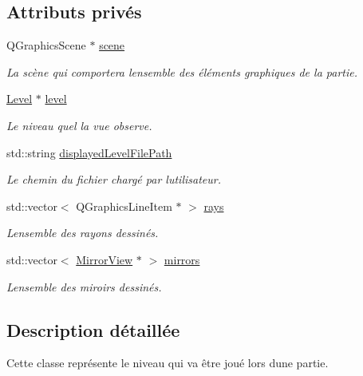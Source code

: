 \subsection*{Attributs privés}
\begin{DoxyCompactItemize}
\item 
Q\+Graphics\+Scene $\ast$ \hyperlink{classLevelView_a81030b9faa8743a629553447bfb982ea}{scene}
\begin{DoxyCompactList}\small\item\em La scène qui comportera l\textquotesingle{}ensemble des éléments graphiques de la partie. \end{DoxyCompactList}\item 
\hyperlink{classLevel}{Level} $\ast$ \hyperlink{classLevelView_ab51fb77e921a425c79b9671ebb8718e2}{level}
\begin{DoxyCompactList}\small\item\em Le niveau quel la vue observe. \end{DoxyCompactList}\item 
std\+::string \hyperlink{classLevelView_a826d9224c5bbbecb5c02b7734d0b8137}{displayed\+Level\+File\+Path}
\begin{DoxyCompactList}\small\item\em Le chemin du fichier chargé par l\textquotesingle{}utilisateur. \end{DoxyCompactList}\item 
std\+::vector$<$ Q\+Graphics\+Line\+Item $\ast$ $>$ \hyperlink{classLevelView_a79c31b19d94522a4756bcf0bbae0c1a1}{rays}
\begin{DoxyCompactList}\small\item\em L\textquotesingle{}ensemble des rayons dessinés. \end{DoxyCompactList}\item 
std\+::vector$<$ \hyperlink{classMirrorView}{Mirror\+View} $\ast$ $>$ \hyperlink{classLevelView_ad530e6ab8704e9201efe04bf98ff44e9}{mirrors}
\begin{DoxyCompactList}\small\item\em L\textquotesingle{}ensemble des miroirs dessinés. \end{DoxyCompactList}\end{DoxyCompactItemize}


\subsection{Description détaillée}
Cette classe représente le niveau qui va être joué lors d\textquotesingle{}une partie. 

